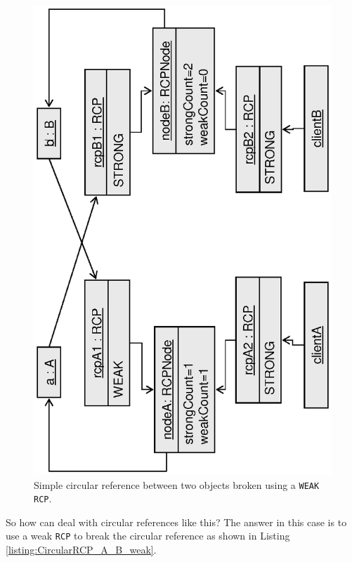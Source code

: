 \documentclass[pdf,ps2pdf,11pt]{SANDreport}
\begin{document}
{\bsinglespace
\begin{figure}
\begin{center}
\includegraphics*[angle=270,scale=0.65]{CircularRCP_A_B_weak}
\end{center}
\caption{
\label{fig:CircularRCP_A_B_weak}
Simple circular reference between two objects broken using a
{}\texttt{WEAK} {}\texttt{RCP}.  }
\end{figure}
\esinglespace}

So how can deal with circular references like this?  The answer in
this case is to use a weak {}\texttt{RCP} to break the circular
reference as shown in Listing {}\ref{listing:CircularRCP_A_B_weak}.
\end{document}
